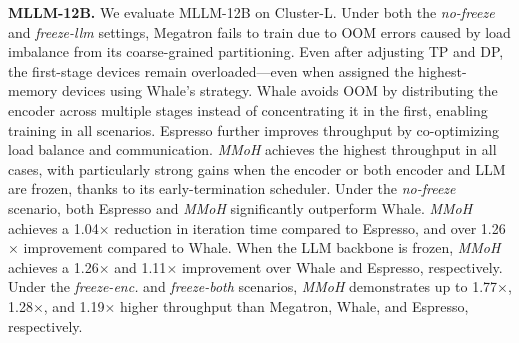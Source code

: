 \documentclass[conference]{IEEEtran}
\begin{document}
\textbf{MLLM-12B.}
We evaluate MLLM-12B on Cluster-L. Under both the \textit{no-freeze} and \textit{freeze-llm} settings, Megatron fails to train due to OOM errors caused by load imbalance from its coarse-grained partitioning.
Even after adjusting TP and DP, the first-stage devices remain overloaded—even when assigned the highest-memory devices using Whale’s strategy.
Whale avoids OOM by distributing the encoder across multiple stages instead of concentrating it in the first, enabling training in all scenarios. Espresso further improves throughput by co-optimizing load balance and communication.
\textit{MMoH} achieves the highest throughput in all cases, with particularly strong gains when the encoder or both encoder and LLM are frozen, thanks to its early-termination scheduler.
Under the \textit{no-freeze} scenario, both Espresso and \textit{MMoH} significantly outperform Whale.
\textit{MMoH} achieves a 1.04$\times$ reduction in iteration time compared to Espresso, and over 1.26$\times$ improvement compared to Whale.
When the LLM backbone is frozen, \textit{MMoH} achieves a 1.26$\times$ and 1.11$\times$ improvement over Whale and Espresso, respectively.
Under the \textit{freeze-enc.} and \textit{freeze-both} scenarios, \textit{MMoH} demonstrates up to 1.77$\times$, 1.28$\times$, and 1.19$\times$ higher throughput than Megatron, Whale, and Espresso, respectively.

\end{document}
